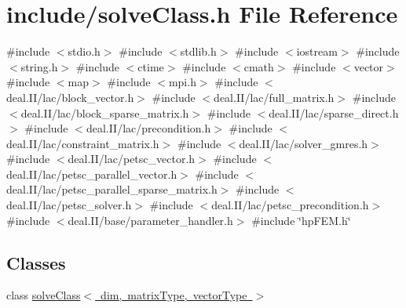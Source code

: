 \section{include/solve\+Class.h File Reference}
\label{solve_class_8h}
{\ttfamily \#include $<$stdio.\+h$>$}\newline
{\ttfamily \#include $<$stdlib.\+h$>$}\newline
{\ttfamily \#include $<$iostream$>$}\newline
{\ttfamily \#include $<$string.\+h$>$}\newline
{\ttfamily \#include $<$ctime$>$}\newline
{\ttfamily \#include $<$cmath$>$}\newline
{\ttfamily \#include $<$vector$>$}\newline
{\ttfamily \#include $<$map$>$}\newline
{\ttfamily \#include $<$mpi.\+h$>$}\newline
{\ttfamily \#include $<$deal.\+I\+I/lac/block\+\_\+vector.\+h$>$}\newline
{\ttfamily \#include $<$deal.\+I\+I/lac/full\+\_\+matrix.\+h$>$}\newline
{\ttfamily \#include $<$deal.\+I\+I/lac/block\+\_\+sparse\+\_\+matrix.\+h$>$}\newline
{\ttfamily \#include $<$deal.\+I\+I/lac/sparse\+\_\+direct.\+h$>$}\newline
{\ttfamily \#include $<$deal.\+I\+I/lac/precondition.\+h$>$}\newline
{\ttfamily \#include $<$deal.\+I\+I/lac/constraint\+\_\+matrix.\+h$>$}\newline
{\ttfamily \#include $<$deal.\+I\+I/lac/solver\+\_\+gmres.\+h$>$}\newline
{\ttfamily \#include $<$deal.\+I\+I/lac/petsc\+\_\+vector.\+h$>$}\newline
{\ttfamily \#include $<$deal.\+I\+I/lac/petsc\+\_\+parallel\+\_\+vector.\+h$>$}\newline
{\ttfamily \#include $<$deal.\+I\+I/lac/petsc\+\_\+parallel\+\_\+sparse\+\_\+matrix.\+h$>$}\newline
{\ttfamily \#include $<$deal.\+I\+I/lac/petsc\+\_\+solver.\+h$>$}\newline
{\ttfamily \#include $<$deal.\+I\+I/lac/petsc\+\_\+precondition.\+h$>$}\newline
{\ttfamily \#include $<$deal.\+I\+I/base/parameter\+\_\+handler.\+h$>$}\newline
{\ttfamily \#include \char`\"{}hp\+F\+E\+M.\+h\char`\"{}}\newline
\subsection*{Classes}
\begin{DoxyCompactItemize}
\item 
class \mbox{\hyperlink{classsolve_class}{solve\+Class$<$ dim, matrix\+Type, vector\+Type $>$}}
\end{DoxyCompactItemize}
